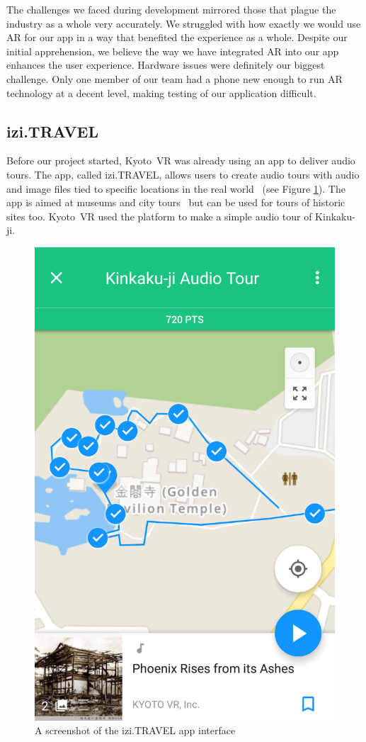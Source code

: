 \documentclass[a4paper, 10pt, american, titlepage]{article}
\begin{document}
The challenges we faced during development mirrored those that plague the
industry as a whole very accurately. We struggled with how exactly we would use
AR for our app in a way that benefited the experience as a whole. Despite our
initial apprehension, we believe the way we have integrated AR into our app
enhances the user experience. Hardware issues were definitely our biggest
challenge. Only one member of our team had a phone new enough to run AR technology at a
decent level, making testing of our application difficult.

\subsection{izi.TRAVEL}
\label{sec:iziTravel}

Before our project started, Kyoto~VR was already using an app to deliver audio
tours. The app, called izi.TRAVEL, allows users to create audio tours with
audio and image files tied to specific locations in the real
world~\autocite{izitravel2015} (see Figure \ref{fig:iziTravel}). The app is
aimed at museums and city tours~\autocite{izitravel} but can be used for tours
of historic sites too.  Kyoto~VR used the platform to make a simple audio tour
of Kinkaku-ji.

\begin{figure}[h]
	\centering
	\includegraphics[width=.5\textwidth]{izi-travel.png}
	\caption{A screenshot of the izi.TRAVEL app interface}
	\label{fig:iziTravel}
\end{figure}
\end{document}
